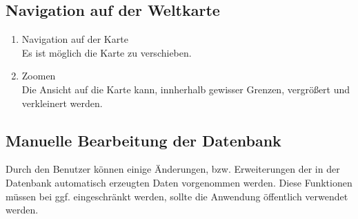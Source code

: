 \subsection{Navigation auf der Weltkarte}
\begin{enumerate}[ align=left, label={\textbf{\textbackslash F30\arabic*0\textbackslash}} ]
	\item Navigation auf der Karte \label{:PF_Navigation} \\
	Es ist möglich die Karte zu verschieben.
	\item Zoomen \label{:PF_Zoomen} \\
	Die Ansicht auf die Karte kann, innherhalb gewisser Grenzen, vergrößert und verkleinert werden.
\end{enumerate}	
\subsection{Manuelle Bearbeitung der Datenbank}
Durch den Benutzer können einige Änderungen, bzw. Erweiterungen der in der Datenbank automatisch erzeugten Daten vorgenommen werden. Diese Funktionen müssen bei ggf. eingeschränkt werden, sollte die Anwendung öffentlich verwendet werden.
